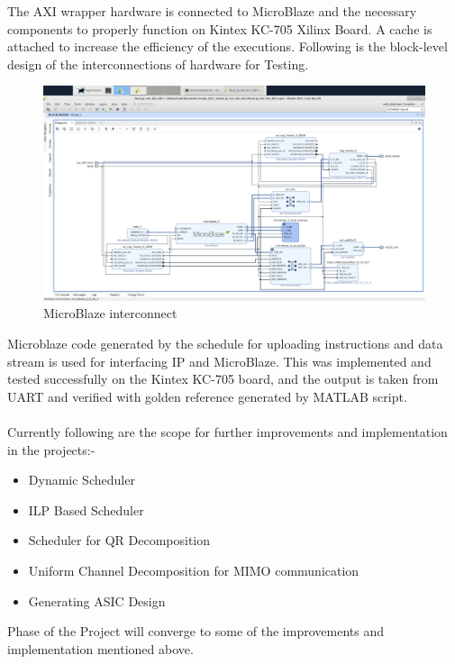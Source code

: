 The AXI wrapper hardware is connected to MicroBlaze and the necessary components to properly function on Kintex KC-705 Xilinx Board. A cache is attached to increase the efficiency of the executions. Following is the block-level design of the interconnections of hardware for Testing.\\



\begin{figure}[H]
    \centering
    \includegraphics[width = \textwidth]{./Software/Schematic_.png}
    \caption{MicroBlaze interconnect}
\end{figure}

\pagebreak
Microblaze code generated by the schedule for uploading instructions and data stream is used for interfacing IP and MicroBlaze. This was implemented and tested successfully on the Kintex KC-705 board, and the output is taken from UART and verified with golden reference generated by MATLAB script.
\\
\\
Currently following are the scope for further improvements and implementation in the projects:-
\begin{itemize}
	\item Dynamic Scheduler
	\item ILP Based Scheduler 
	\item Scheduler for QR Decomposition
	\item Uniform Channel Decomposition for MIMO communication
	\item Generating ASIC Design 
\end{itemize}
Phase  of the Project will converge to some of the improvements and implementation mentioned above.